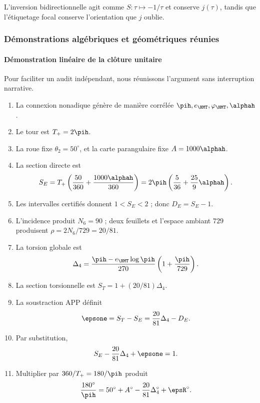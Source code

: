 \begin{theorem}[Modularité]
L'inversion bidirectionnelle agit comme \(S:\tau\mapsto-1/\tau\) et conserve
\(j(\tau)\), tandis que l'étiquetage focal conserve l'orientation que
\(j\) oublie.
\end{theorem}

\subsubsection{Démonstrations algébriques et géométriques réunies}

\paragraph{Démonstration linéaire de la clôture unitaire}

Pour faciliter un audit indépendant, nous réunissons l'argument sans
interruption narrative.

\begin{enumerate}[label=\textbf{Étape \arabic*.},leftmargin=2.2cm]
\item La connexion nonadique génère de manière corrélée
\(\pih,e_{\HMT},\varphi_{\HMT},\alphah\).
\item Le tour est \(T_+=2\pih\).
\item La roue fixe \(\theta_2=50^\circ\), et la carte parangulaire fixe
\(A=1000\alphah\).
\item La section directe est
\[
S_E=T_+\left(\frac{50}{360}+\frac{1000\alphah}{360}\right)
=2\pih\left(\frac5{36}+\frac{25}{9}\alphah\right).
\]
\item Les intervalles certifiés donnent \(1<S_E<2\) ; donc
\(D_E=S_E-1\).
\item L'incidence produit \(N_6=90\) ; deux feuillets et l'espace ambiant \(729\)
produisent \(\rho=2N_6/729=20/81\).
\item La torsion globale est
\[
\Delta_4=\frac{\pih-e_{\HMT}\log\pih}{270}
\left(1+\frac{\pih}{729}\right).
\]
\item La section torsionnelle est \(S_T=1+(20/81)\Delta_4\).
\item La soustraction APP définit
\[
\epsone=S_T-S_E=\frac{20}{81}\Delta_4-D_E.
\]
\item Par substitution,
\[
S_E-\frac{20}{81}\Delta_4+\epsone=1.
\]
\item Multiplier par \(360/T_+=180/\pih\) produit
\[
\frac{180^\circ}{\pih}
=50^\circ+A^\circ-\frac{20}{81}\Delta_4^\circ+\epsR^\circ.
\]
\end{enumerate}

